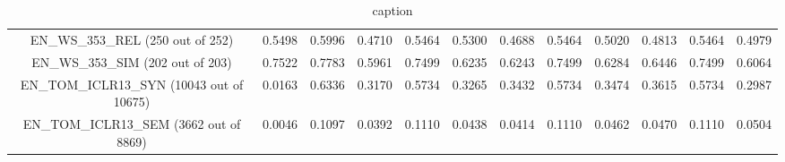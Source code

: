 \documentclass[11pt]{article}
\begin{document}
\begin{table*}[tp]
{\begin{tabular}{cccccccccccc}
EN\_WS\_353\_REL (250 out of 252)       & 0.5498       &         0.5996 &      0.4710 &       0.5464 &       0.5300 &  0.4688  &     0.5464 &      0.5020  &      0.4813     &  0.5464          &  0.4979               \\
EN\_WS\_353\_SIM (202 out of 203)        &0.7522       &         0.7783 &      0.5961 &       0.7499 &       0.6235 &  0.6243  &     0.7499 &      0.6284  &      0.6446     &  0.7499          &  0.6064               \\
EN\_TOM\_ICLR13\_SYN (10043 out of 10675)&0.0163       &         0.6336 &      0.3170 &       0.5734 &       0.3265 &  0.3432  &     0.5734 &      0.3474  &      0.3615     &  0.5734          &  0.2987               \\
EN\_TOM\_ICLR13\_SEM (3662 out of 8869)  &0.0046       &         0.1097 &      0.0392 &       0.1110 &       0.0438 &  0.0414  &     0.1110 &      0.0462  &      0.0470     &  0.1110          &  0.0504               \\

  \end{tabular}}
  \caption{caption}
  \label{tab:eval}
\end{table*}
\end{document}
